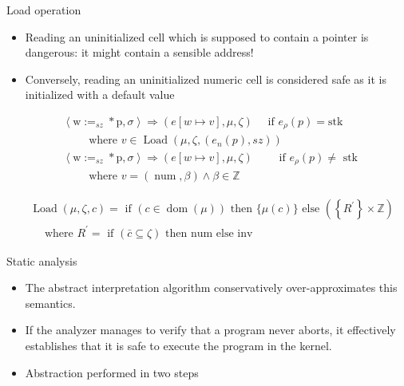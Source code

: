 \documentclass[aspectratio=169]{beamer}
\begin{document}
\begin{frame}{Load operation}
  \begin{itemize}
    \item Reading an uninitialized cell which is supposed to contain a pointer is dangerous: it might contain
    a sensible address!
    \item Conversely, reading an uninitialized numeric cell is considered safe as it is initialized with a default value
  \end{itemize}
  \begin{align*}
     & \left\langle\mathrm{w}:=_{s z} * \mathrm{p}, \sigma\right\rangle \Rightarrow(e[w \mapsto v], \mu, \zeta) \quad \text{ if } e_\rho(p)=\text{stk}              \\
     & \qquad \text { where } v \in \operatorname{Load}\left(\mu, \zeta,\left(e_n(p), s z\right)\right)                                                             \\
     & \left\langle\mathrm{w}:=_{s z} * \mathrm{p}, \sigma\right\rangle \Rightarrow(e[w \mapsto v], \mu, \zeta) \quad \quad \text{ if } e_\rho(p) \neq \text{ stk } \\
     & \qquad \text { where } v=(\operatorname{num}, \beta) \wedge \beta \in \mathbb{Z}
  \end{align*}

  $$
    \begin{aligned}
       & \operatorname{Load}(\mu, \zeta, c)=\text { if }(c \in \operatorname{dom}(\mu)) \text { then }\{\mu(c)\} \text { else }\left(\left\{R^{\prime}\right\} \times \mathbb{Z}\right) \\
       & \quad \text { where } R^{\prime}=\text { if }(\bar{c} \subseteq \zeta) \text { then num else inv }
    \end{aligned}
  $$
\end{frame}

\begin{frame}{Static analysis}
  \begin{itemize}
    \item The abstract interpretation algorithm conservatively over-approximates this semantics.
    \item If the analyzer manages to verify that a program never aborts, it effectively
          establishes that it is safe to execute the program in the kernel.
    \item Abstraction performed in two steps
  \end{itemize}
\end{frame}
\end{document}
